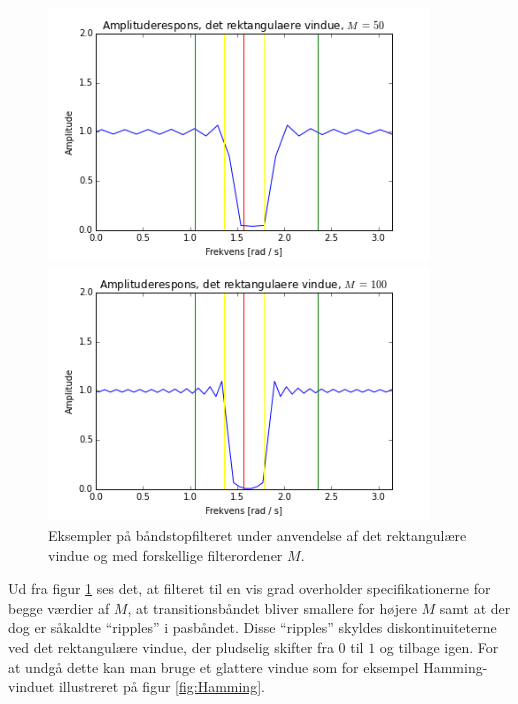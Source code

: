 \begin{figure}[H]
\begin{minipage}{0.49\textwidth}
\includegraphics[width=0.9\textwidth]{figures/Filter/Filter_rekt_50.PNG}
\end{minipage}
\begin{minipage}{0.49\textwidth}
\includegraphics[width=0.9\textwidth]{figures/Filter/Filter_rekt_100.PNG}
\end{minipage}
\caption{Eksempler på båndstopfilteret under anvendelse af det rektangulære vindue og med forskellige filterordener $M$.}
\label{fig:filter_rekt}
\end{figure}

Ud fra figur \ref{fig:filter_rekt} ses det, at filteret til en vis grad overholder specifikationerne for begge værdier af $M$, at transitionsbåndet bliver smallere for højere $M$ samt at der dog er såkaldte ``ripples'' i pasbåndet. Disse ``ripples'' skyldes diskontinuiteterne ved det rektangulære vindue, der pludselig skifter fra $0$ til $1$ og tilbage igen. For at undgå dette kan man bruge et glattere vindue som for eksempel Hamming-vinduet illustreret på figur \ref{fig:Hamming}.
